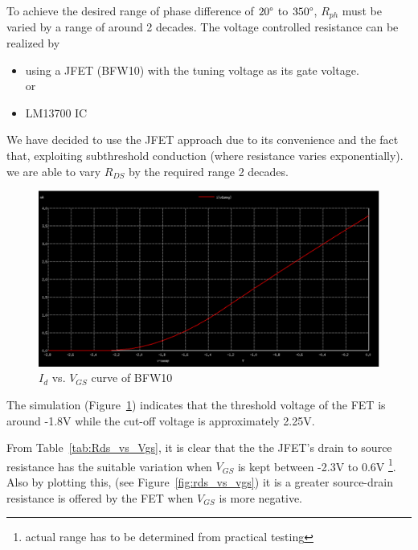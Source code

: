 \documentclass[10pt, conference]{IEEEtran}
\begin{document}
To achieve the desired range of phase difference of $20\degree$ to $350\degree$, $R_{ph}$ must be varied by a range of around 2 decades.
The voltage controlled resistance can be realized by
\begin{itemize}
    \item using a JFET (BFW10) with the tuning voltage as its gate voltage.\\
    or
    \item LM13700 IC
\end{itemize}

We have decided to use the JFET approach due to its convenience and the fact that, exploiting subthreshold conduction (where resistance varies exponentially). we are able to vary $R_{DS}$ by the required range 2 decades.

\begin{figure}[bhp]
    \centering
    \includegraphics[width=\columnwidth]{GIT_Id_vs_Vgs.PNG}
    \caption{$I_d$ vs. $V_{GS}$ curve of BFW10}
    \label{fig:Id_Vgs}
\end{figure}
The simulation (Figure~\ref{fig:Id_Vgs}) indicates that the threshold voltage of the FET is around -1.8V while the cut-off voltage is approximately 2.25V.

From Table~\ref{tab:Rds_vs_Vgs}, it is clear that the the JFET's drain to source resistance has the suitable variation when $V_{GS}$ is kept between -2.3V to 0.6V \footnote{actual range has to be determined from practical testing}. Also by plotting this, (see Figure~\ref{fig:rds_vs_vgs}) it is a greater source-drain resistance is offered by the FET when $V_{GS}$ is more negative.
\end{document}
